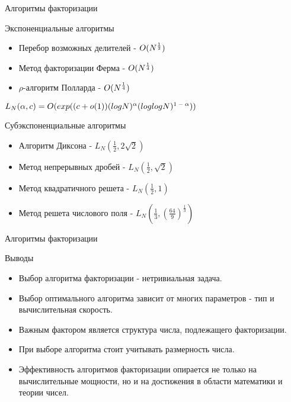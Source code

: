 \begin{frame}{Алгоритмы факторизации}
	\begin{block}{Экспоненциальные алгоритмы}
		\begin{itemize}
			\item Перебор возможных делителей - {$O(N\textsuperscript{{$\frac{1}{2}$}})$}
			\item Метод факторизации Ферма - {$O(N\textsuperscript{{$\frac{1}{4}$}})$}
	        \item {$\rho$}-алгоритм Полларда - {$O(N\textsuperscript{{$\frac{1}{4}$}})$}	        
    	\end{itemize}
	\end{block}

	\begin{center}
		$L_N(\alpha,c)=O(exp((c+o(1))(logN)^\alpha(loglogN)\textsuperscript{{$1-\alpha$}}))$
	\end{center}

	\begin{block}{Субэкспоненциальные алгоритмы}
		\begin{itemize}
			\item Алгоритм Диксона - {$L_N(\frac{1}{2}, 2\sqrt{2})$}
	        \item Метод непрерывных дробей - {$L_N(\frac{1}{2}, \sqrt{2})$}
	        \item Метод квадратичного решета - {$L_N(\frac{1}{2}, 1)$}
	        \item Метод решета числового поля - {$L_N(\frac{1}{3}, (\frac{64}{9})^\frac{1}{3})$} 
    	\end{itemize}
	\end{block}
\end{frame}

\begin{frame}{Алгоритмы факторизации}
	\begin{center}
		{\LARGE Выводы }

		\begin{itemize}
			\item Выбор алгоритма факторизации - нетривиальная задача.
			\item Выбор оптимального алгоритма зависит от многих параметров - тип и вычислительная скорость.
			\item Важным фактором является структура числа, подлежащего факторизации.
			\item При выборе алгоритма стоит учитывать размерность числа.
			\item Эффективность алгоритмов факторизации опирается не только на вычислительные мощности, но и на достижения в области математики и теории чисел.
		\end{itemize}
	\end{center}
\end{frame}

